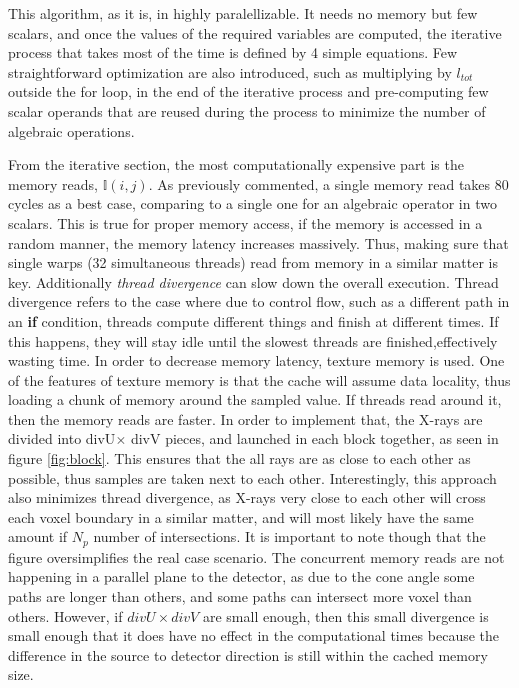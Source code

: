 

This algorithm, as it is, in highly paralellizable. It needs no memory but few scalars, and once the values of the required variables are computed, the iterative process that takes most of the time is defined by 4 simple equations. Few straightforward optimization are also introduced, such as multiplying by $l_{tot}$ outside the for loop, in the end of the iterative process and pre-computing few scalar operands that are reused during the process to minimize the number of algebraic operations.




From the iterative section, the most computationally expensive part is the memory reads, $\mathbb{I}(i,j)$. As previously commented, a single memory read takes 80 cycles as a best case, comparing to a single one for an algebraic operator in two scalars. This is true for proper memory access, if the memory is accessed in a random manner, the memory latency increases massively. Thus, making sure that single warps (32 simultaneous threads) read from memory in a similar matter is key. Additionally \textit{thread divergence} can slow down the overall execution. Thread divergence refers to the case where due to control flow, such as a different path in an \textbf{if} condition, threads compute different things and finish at different times. If this happens, they will stay idle until the slowest threads are finished,effectively wasting time. In order to decrease memory latency, texture memory is used. One of the features of texture memory is that the cache will assume data locality, thus loading a chunk of memory around the sampled value. If threads read around it, then the memory reads are faster. In order to implement that, the X-rays are divided into divU$\times$ divV pieces, and launched in each block together, as seen in figure \ref{fig:block}. This ensures that the all rays are as close to each other as possible, thus samples are taken next to each other. Interestingly, this approach also minimizes thread divergence, as X-rays very close to each other will cross each voxel boundary in a similar matter, and will most likely have the same amount if $N_p$ number of intersections. It is important to note though that the figure oversimplifies the real case scenario. The concurrent memory reads are not happening in a parallel plane to the detector, as due to the cone angle some paths are longer than others, and some paths can intersect more voxel than others. However, if $divU\times divV$ are small enough, then this small divergence is small enough that it does have no effect in the computational times because the difference in the source to detector direction is still within the cached memory size.


